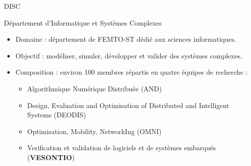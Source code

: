 \begin{frame}{DISC}
    \begin{block}{Département d'Informatique et Systèmes Complexes}
    
    \begin{itemize}
        \item Domaine : département de FEMTO-ST dédié aux sciences informatiques.
        \item Objectif : modéliser, simuler, développer et valider des systèmes complexes.
        \item Composition : environ 100 membres répartis en quatre équipes de recherche :
        \begin{itemize}
            \item Algorithmique Numérique Distribuée (AND)
            \item Design, Evaluation and Optimisation of Distributed and Intelligent Systems (DEODIS)
            \item Optimisation, Mobility, NetworkIng (OMNI)
            \item Verification et validation de logiciels et de systèmes embarqués (\textbf{VESONTIO})
        \end{itemize}
    \end{itemize}
    \end{block}
\end{frame}

